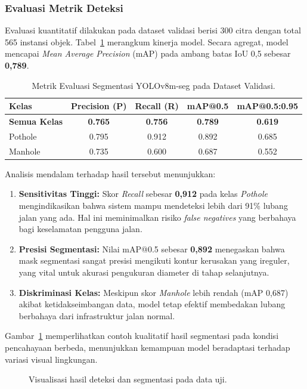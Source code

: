 \subsubsection{Evaluasi Metrik Deteksi}

Evaluasi kuantitatif dilakukan pada dataset validasi berisi 300 citra dengan total 565 instansi objek. Tabel~\ref{tab:yolo_metrics} merangkum kinerja model. Secara agregat, model mencapai \textit{Mean Average Precision} (mAP) pada ambang batas IoU 0,5 sebesar \textbf{0,789}.

\begin{table}[h]
\caption{\label{tab:yolo_metrics}Metrik Evaluasi Segmentasi YOLOv8m-seg pada Dataset Validasi.}
\begin{center}
\begin{tabular}{lcccc}
\toprule
Kelas & Precision (P) & Recall (R) & mAP@0.5 & mAP@0.5:0.95 \\
\midrule
\textbf{Semua Kelas} & \textbf{0.765} & \textbf{0.756} & \textbf{0.789} & \textbf{0.619} \\
Pothole & 0.795 & 0.912 & 0.892 & 0.685 \\
Manhole & 0.735 & 0.600 & 0.687 & 0.552 \\
\bottomrule
\end{tabular}
\end{center}
\end{table}

Analisis mendalam terhadap hasil tersebut menunjukkan:
\begin{enumerate}
    \item \textbf{Sensitivitas Tinggi:} Skor \textit{Recall} sebesar \textbf{0,912} pada kelas \textit{Pothole} mengindikasikan bahwa sistem mampu mendeteksi lebih dari 91\% lubang jalan yang ada. Hal ini meminimalkan risiko \textit{false negatives} yang berbahaya bagi keselamatan pengguna jalan.
    \item \textbf{Presisi Segmentasi:} Nilai mAP@0.5 sebesar \textbf{0,892} menegaskan bahwa mask segmentasi sangat presisi mengikuti kontur kerusakan yang ireguler, yang vital untuk akurasi pengukuran diameter di tahap selanjutnya.
    \item \textbf{Diskriminasi Kelas:} Meskipun skor \textit{Manhole} lebih rendah (mAP 0,687) akibat ketidakseimbangan data, model tetap efektif membedakan lubang berbahaya dari infrastruktur jalan normal.
\end{enumerate}

Gambar~\ref{fig:detection_results} memperlihatkan contoh kualitatif hasil segmentasi pada kondisi pencahayaan berbeda, menunjukkan kemampuan model beradaptasi terhadap variasi visual lingkungan.

\begin{figure}[htbp]
  \centering
  \caption{Visualisasi hasil deteksi dan segmentasi pada data uji.}
  \label{fig:detection_results}
\end{figure}


